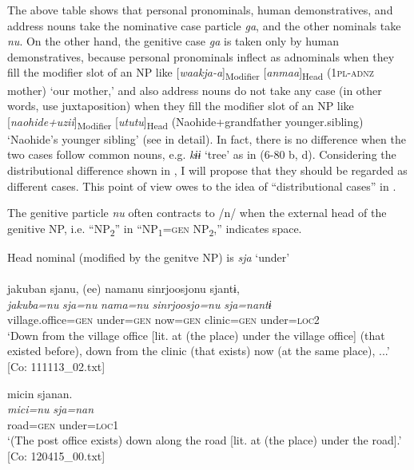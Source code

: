 The above table shows that personal pronominals, human demonstratives, and address nouns take the nominative case particle \textit{ga}, and the other nominals take \textit{nu}. On the other hand, the genitive case \textit{ga} is taken only by human demonstratives, because personal pronominals inflect as adnominals when they fill the modifier slot of an NP like [\textit{waakja-a}]\textsubscript{Modifier} [\textit{anmaa}]\textsubscript{Head} (1\textsc{pl}-\textsc{adnz} mother) ‘our mother,’ and also address nouns do not take any case (in other words, use juxtaposition) when they fill the modifier slot of an NP like [\textit{naohide+uzii}]\textsubscript{Modifier} [\textit{ututu}]\textsubscript{Head} (Naohide+grandfather younger.sibling) ‘Naohide’s younger sibling’ (see  in detail). In fact, there is no difference when the two cases follow common nouns, e.g. \textit{kɨɨ} ‘tree’ as in (6-80 b, d). Considering the distributional difference shown in , I will propose that they should be regarded as different cases. This point of view owes to the idea of “distributional cases” in \citet{Comrie1991}.

  The genitive particle \textit{nu} often contracts to /n/ when the external head of the genitive NP, i.e. “NP\textsubscript{2}” in “NP\textsubscript{1}=\textsc{gen} NP\textsubscript{2},” indicates space.

\ea\label{ex:6-81}
 Head nominal (modified by the genitve NP) is \textit{sja} ‘under’\\

 \ea{}\\
{\TM}
\glll  jakuban  sjanu,  (ee)  namanu  {\textbar}sinrjoosjo{\textbar}nu    sjantɨ,\\
\textit{jakuba=nu}  \textit{sja=nu}    \textit{nama=nu}  \textit{sinrjoosjo=nu}    \textit{sja=nantɨ}\\
village.office=\textsc{gen}  under=\textsc{gen}    now=\textsc{gen}  clinic=\textsc{gen}    under=\textsc{loc2}\\
\glt ‘Down from the village office [lit. at (the place) under the village office] (that existed before), down from the clinic (that exists) now (at the same place), ...’ [Co: 111113\_02.txt]

\ex
{\TM}
\glll micin  sjanan.\\
\textit{mici=nu}  \textit{sja=nan}\\
road=\textsc{gen}  under=\textsc{loc1}\\
\glt ‘(The post office exists) down along the road [lit. at (the place) under the road].’ [Co: 120415\_00.txt]

